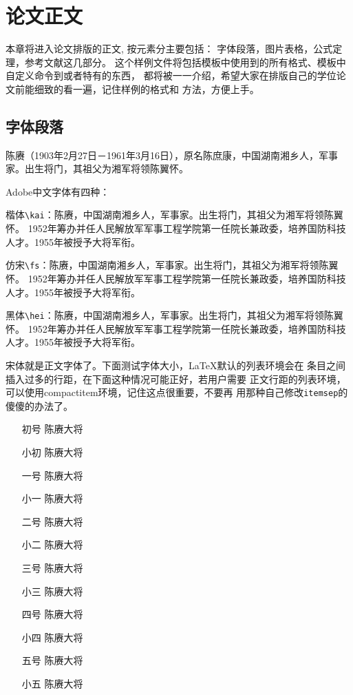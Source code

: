 \chapter{论文正文}
\label{chap:main}
本章将进入论文排版的正文, 按元素分主要包括：
{\kai 字体段落，图片表格，公式定理，参考文献}这几部分。
这个样例文件将包括模板中使用到的所有格式、模板中自定义命令到或者特有的东西，
都将被一一介绍，希望大家在排版自己的学位论文前能细致的看一遍，记住样例的格式和
方法，方便上手。

\section{字体段落}
\label{sec:font}

陈赓（1903年2月27日－1961年3月16日），原名陈庶康，中国湖南湘乡人，军事家。出生将门，其祖父为湘军将领陈翼怀。

Adobe中文字体有四种：

{\kai 楷体\verb|\kai|：陈赓，中国湖南湘乡人，军事家。出生将门，其祖父为湘军将领陈翼怀。%
1952年筹办并任人民解放军军事工程学院第一任院长兼政委，培养国防科技人才。1955年被授予大将军衔。}

{\fs 仿宋\verb|\fs|：陈赓，中国湖南湘乡人，军事家。出生将门，其祖父为湘军将领陈翼怀。%
1952年筹办并任人民解放军军事工程学院第一任院长兼政委，培养国防科技人才。1955年被授予大将军衔。}

{\hei 黑体\verb|\hei|：陈赓，中国湖南湘乡人，军事家。出生将门，其祖父为湘军将领陈翼怀。%
1952年筹办并任人民解放军军事工程学院第一任院长兼政委，培养国防科技人才。1955年被授予大将军衔。}

宋体就是正文字体了。下面测试字体大小，\LaTeX{}默认的列表环境会在
条目之间插入过多的行距，在下面这种情况可能正好，若用户需要
{\kai 正文行距}的列表环境，可以使用compactitem环境，记住这点很重要，不要再
用那种自己修改\verb|itemsep|的傻傻的办法了。
\begin{itemize}
\item[初号] {\song\chuhao 陈赓大将}
\item[小初] {\song\xiaochu 陈赓大将}
\item[一号] {\song\yihao 陈赓大将}
\item[小一] {\song\xiaoyi 陈赓大将}
\item[二号] {\song\erhao 陈赓大将}
\item[小二] {\song\xiaoer 陈赓大将}
\item[三号] {\song\sanhao 陈赓大将}
\item[小三] {\song\xiaosan 陈赓大将}
\item[四号] {\song\sihao 陈赓大将}
\item[小四] {\song\xiaosi 陈赓大将}
\item[五号] {\song\wuhao 陈赓大将}
\item[小五] {\song\xiaowu 陈赓大将}
\end{itemize}


